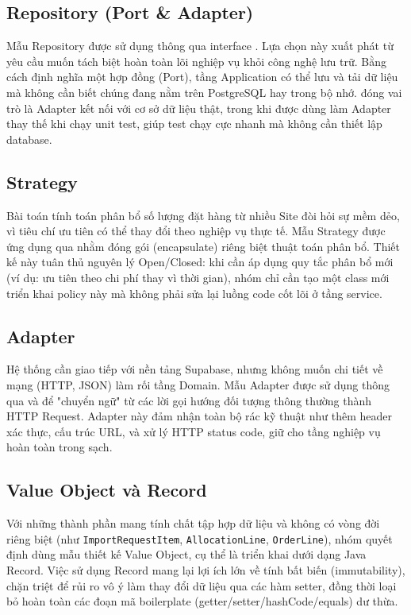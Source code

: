 \subsection{Repository (Port \& Adapter)}

Mẫu Repository được sử dụng thông qua interface . Lựa chọn này xuất phát từ yêu cầu muốn tách biệt hoàn toàn lõi nghiệp vụ khỏi công nghệ lưu trữ. Bằng cách định nghĩa một hợp đồng (Port), tầng Application có thể lưu và tải dữ liệu mà không cần biết chúng đang nằm trên PostgreSQL hay trong bộ nhớ.  đóng vai trò là Adapter kết nối với cơ sở dữ liệu thật, trong khi  được dùng làm Adapter thay thế khi chạy unit test, giúp test chạy cực nhanh mà không cần thiết lập database.

\subsection{Strategy}

Bài toán tính toán phân bổ số lượng đặt hàng từ nhiều Site đòi hỏi sự mềm dẻo, vì tiêu chí ưu tiên có thể thay đổi theo nghiệp vụ thực tế. Mẫu Strategy được ứng dụng qua  nhằm đóng gói (encapsulate) riêng biệt thuật toán phân bổ. Thiết kế này tuân thủ nguyên lý Open/Closed: khi cần áp dụng quy tắc phân bổ mới (ví dụ: ưu tiên theo chi phí thay vì thời gian), nhóm chỉ cần tạo một class mới triển khai policy này mà không phải sửa lại luồng code cốt lõi ở tầng service.

\subsection{Adapter}

Hệ thống cần giao tiếp với nền tảng Supabase, nhưng không muốn chi tiết về mạng (HTTP, JSON) làm rối tầng Domain. Mẫu Adapter được sử dụng thông qua  và  để "chuyển ngữ" từ các lời gọi hướng đối tượng thông thường thành HTTP Request. Adapter này đảm nhận toàn bộ rác kỹ thuật như thêm header xác thực, cấu trúc URL, và xử lý HTTP status code, giữ cho tầng nghiệp vụ hoàn toàn trong sạch.

\subsection{Value Object và Record}

Với những thành phần mang tính chất tập hợp dữ liệu và không có vòng đời riêng biệt (như \texttt{Import}\allowbreak\texttt{Request}\allowbreak\texttt{Item}, \texttt{Allocation}\allowbreak\texttt{Line}, \texttt{Order}\allowbreak\texttt{Line}), nhóm quyết định dùng mẫu thiết kế Value Object, cụ thể là triển khai dưới dạng Java Record. Việc sử dụng Record mang lại lợi ích lớn về tính bất biến (immutability), chặn triệt để rủi ro vô ý làm thay đổi dữ liệu qua các hàm setter, đồng thời loại bỏ hoàn toàn các đoạn mã boilerplate (getter/setter/hashCode/equals) dư thừa.
